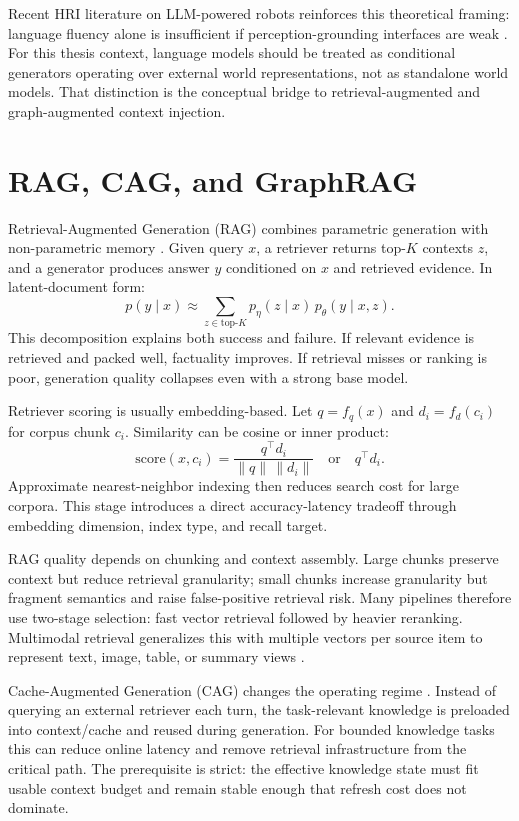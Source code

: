   Recent HRI literature on LLM-powered robots reinforces this theoretical framing: language fluency alone is insufficient if perception-grounding interfaces are weak
  \cite{kim_understanding_2024,atuhurra_leveraging_2024}. For this thesis context, language models should be treated as conditional generators operating over external world representations, not as
  standalone world models. That distinction is the conceptual bridge to retrieval-augmented and graph-augmented context injection.

  \section{RAG, CAG, and GraphRAG}

  Retrieval-Augmented Generation (RAG) combines parametric generation with non-parametric memory \cite{lewis_retrieval-augmented_2020}. Given query \(x\), a retriever returns top-\(K\) contexts \(z\),
  and a generator produces answer \(y\) conditioned on \(x\) and retrieved evidence. In latent-document form:
  \[
  p(y\mid x)\approx \sum_{z\in \mathrm{top}\text{-}K} p_\eta(z\mid x)\,p_\theta(y\mid x,z).
  \]
  This decomposition explains both success and failure. If relevant evidence is retrieved and packed well, factuality improves. If retrieval misses or ranking is poor, generation quality collapses even
  with a strong base model.

  Retriever scoring is usually embedding-based. Let \(q=f_q(x)\) and \(d_i=f_d(c_i)\) for corpus chunk \(c_i\). Similarity can be cosine or inner product:
  \[
  \mathrm{score}(x,c_i)=\frac{q^\top d_i}{\|q\|\,\|d_i\|}\quad \text{or}\quad q^\top d_i.
  \]
  Approximate nearest-neighbor indexing then reduces search cost for large corpora. This stage introduces a direct accuracy-latency tradeoff through embedding dimension, index type, and recall target.

  RAG quality depends on chunking and context assembly. Large chunks preserve context but reduce retrieval granularity; small chunks increase granularity but fragment semantics and raise false-positive
  retrieval risk. Many pipelines therefore use two-stage selection: fast vector retrieval followed by heavier reranking. Multimodal retrieval generalizes this with multiple vectors per source item to
  represent text, image, table, or summary views \cite{noauthor_multi-vector_nodate,zheng_retrieval_2025}.

  Cache-Augmented Generation (CAG) changes the operating regime \cite{Chan_2025}. Instead of querying an external retriever each turn, the task-relevant knowledge is preloaded into context/cache and
  reused during generation. For bounded knowledge tasks this can reduce online latency and remove retrieval infrastructure from the critical path. The prerequisite is strict: the effective knowledge
  state must fit usable context budget and remain stable enough that refresh cost does not dominate.

